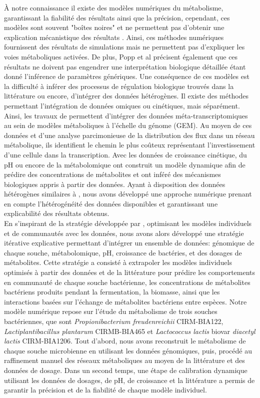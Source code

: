 À notre connaissance il existe des modèles numériques du métabolisme, garantissant la fiabilité des résultats ainsi que la précision, cependant, ces modèles sont souvent "boîtes noires" et ne permettent pas d'obtenir une explication mécanistique des résultats \citep{Popp2020, Zomorrodi}.  Ainsi, ces méthodes numériques fournissent des résultats de simulations mais ne permettent pas d'expliquer les voies métaboliques activées. De plus, Popp et al précisent également que ces résultats ne doivent pas engendrer une interprétation biologique détaillée étant donné l'inférence de paramètres génériques. Une conséquence de ces modèles est la difficulté à inférer des processus de régulation biologique trouvés dans la littérature ou encore, d'intégrer des données hétérogènes. Il existe des méthodes permettant l'intégration de données omiques ou cinétiques, mais séparément. Ainsi, les travaux de \citep{Jenior2020} permettent d'intégrer des données méta-transcriptomiques au sein de modèles métaboliques à l'échelle du génome (GEM). Au moyen de ces données et d'une analyse parcimonieuse de la distribution des flux dans un réseau métabolique, ils identifient le chemin le plus coûteux représentant l'investissement d'une cellule dans la transcription. Avec les données de croissance cinétique, du pH ou encore de la métabolomique \citep{Ozcan.2020} ont construit un modèle dynamique afin de prédire des concentrations de métabolites et ont inféré des mécanismes biologiques appris à partir des données. Ayant à disposition des données hétérogènes similaires à \citep{Ozcan.2020}, nous avons développé une approche numérique prenant en compte l'hétérogénéité des données disponibles et garantissant une explicabilité des résultats obtenus.\\

En s'inspirant de la stratégie développée par \citep{Ozcan.2020}, optimisant les modèles individuels et de communautés avec les données, nous avons alors développé une stratégie itérative explicative permettant d'intégrer un ensemble de données: génomique de chaque souche, métabolomique, pH, croissance de bactéries, et des dosages de métabolites. Cette stratégie a consisté à extrapoler les modèles individuels optimisés à partir des données et de la littérature pour prédire les comportements en communauté de chaque souche bactérienne, les concentrations de métabolites bactériens produits pendant la fermentation, la biomasse, ainsi que les interactions basées sur l'échange de métabolites bactériens entre espèces. Notre modèle numérique repose sur l'étude du métabolisme de trois souches bactériennes, que sont \textit{Propionibacterium freudenreichii} CIRM-BIA122, \textit{Lactiplantibacillus plantarum} CIRMB-BIA465 et \textit{Lactococcus lactis} biovar \textit{diacetyl lactis} CIRM-BIA1206. Tout d'abord, nous avons reconstruit le métabolisme de chaque souche microbienne en utilisant les données génomiques, puis, procédé au raffinement manuel des réseaux métaboliques au moyen de la littérature et des données de dosage. Dans un second temps, une étape de calibration dynamique utilisant les données de dosages, de pH, de croissance et la littérature a permis de garantir la précision et de la fiabilité de chaque modèle individuel. \\

